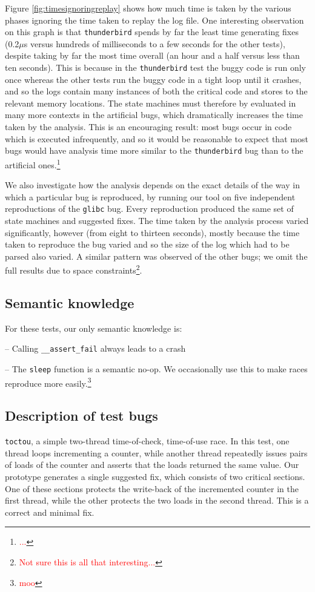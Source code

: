 \documentclass[10pt,twocolumn,preprint,natbib,authoryear]{sigplanconf}
\newcommand{\editorial}[1]{\textcolor{red}{\footnote{\textcolor{red}{#1}}}}
\begin{document}
Figure \ref{fig:timesignoringreplay} shows how much time is taken by
the various phases ignoring the time taken to replay the log file.
One interesting observation on this graph is that \verb|thunderbird|
spends by far the least time generating fixes (0.2$\mu{}$s versus
hundreds of milliseconds to a few seconds for the other tests),
despite taking by far the most time overall (an hour and a half versus
less than ten seconds).  This is because in the \verb|thunderbird|
test the buggy code is run only once whereas the other tests run the
buggy code in a tight loop until it crashes, and so the logs contain
many instances of both the critical code and stores to the relevant
memory locations.  The state machines must therefore by evaluated in
many more contexts in the artificial bugs, which dramatically
increases the time taken by the analysis.  This is an encouraging
result: most bugs occur in code which is executed infrequently, and so
it would be reasonable to expect that most bugs would have analysis
time more similar to the \verb|thunderbird| bug than to the artificial
ones.\editorial{...}

We also investigate how the analysis depends on the exact details of
the way in which a particular bug is reproduced, by running our tool
on five independent reproductions of the \verb|glibc| bug.  Every
reproduction produced the same set of state machines and suggested
fixes.  The time taken by the analysis process varied significantly,
however (from eight to thirteen seconds), mostly because the time
taken to reproduce the bug varied and so the size of the log which had
to be parsed also varied.  A similar pattern was observed of the other
bugs; we omit the full results due to space constraints\editorial{Not
  sure this is all that interesting...}.

\subsection{Semantic knowledge}

For these tests, our only semantic knowledge is:

-- Calling \verb|__assert_fail| always leads to a crash

-- The \verb|sleep| function is a semantic no-op.  We occasionally use
this to make races reproduce more easily.\editorial{moo}

\subsection{Description of test bugs}
\label{sect:bug_descr}
\verb|toctou|, a simple two-thread time-of-check, time-of-use race.
In this test, one thread loops incrementing a counter, while another
thread repeatedly issues pairs of loads of the counter and asserts
that the loads returned the same value.  Our prototype generates a
single suggested fix, which consists of two critical sections.  One of
these sections protects the write-back of the incremented counter in
the first thread, while the other protects the two loads in the second
thread.  This is a correct and minimal fix.
\end{document}
